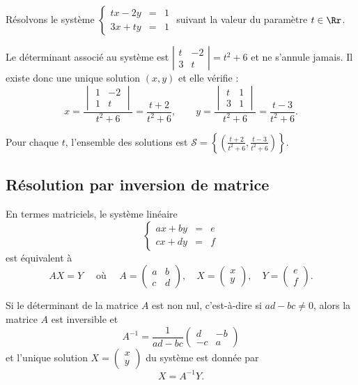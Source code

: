 \documentclass[class=report,crop=false]{standalone}
\begin{document}
\begin{exemple}
Résolvons le système
$
\left\{\begin{array}{rcl}
t x - 2y   & = & 1\\
3x + t y & = & 1
\end{array}\right.
$
suivant la valeur du paramètre $t\in \Rr$.

Le déterminant associé au système est
$\left| \begin{smallmatrix} t & -2 \\ 3 & t \end{smallmatrix}\right|= t^2+6$
et ne s'annule jamais. Il existe donc une unique solution $(x,y)$ et elle vérifie :
$$x = \frac{\begin{vmatrix} 1 & -2 \\ 1 & t \end{vmatrix}}{t^2+6} = \frac{t+2}{t^2+6}, \qquad
y = \frac{\begin{vmatrix} t & 1 \\ 3 & 1 \end{vmatrix}}{t^2+6} = \frac{t-3}{t^2+6}.$$

Pour chaque $t$, l'ensemble des solutions est
$\mathcal{S}= \left\lbrace \left(\frac{t+2}{t^2+6},\frac{t-3}{t^2+6}\right) \right\rbrace$.
\end{exemple}

\subsection{Résolution par inversion de matrice}

En termes matriciels, le système linéaire
$$
\left\{\begin{array}{rcl}
a x + b y & = & e\\
c x + d y & = & f
\end{array}\right.
$$
est équivalent à
$$AX = Y \quad \text{ où } \quad A = \begin{pmatrix} a & b \\ c & d \end{pmatrix},
\quad  X = \begin{pmatrix} x \\ y \end{pmatrix}, \quad Y = \begin{pmatrix} e \\ f \end{pmatrix}.$$

Si le déterminant de la matrice $A$ est non nul, c'est-à-dire si $ad-bc \neq 0$,
alors la matrice $A$ est inversible et
$$A^{-1} = \frac{1}{ad-bc} \begin{pmatrix} d & -b \\ -c & a \end{pmatrix}$$
et l'unique solution $X=\left( \begin{smallmatrix} x \\ y \end{smallmatrix}\right)$
du système est donnée par
$$X = A^{-1} Y.$$
\end{document}
